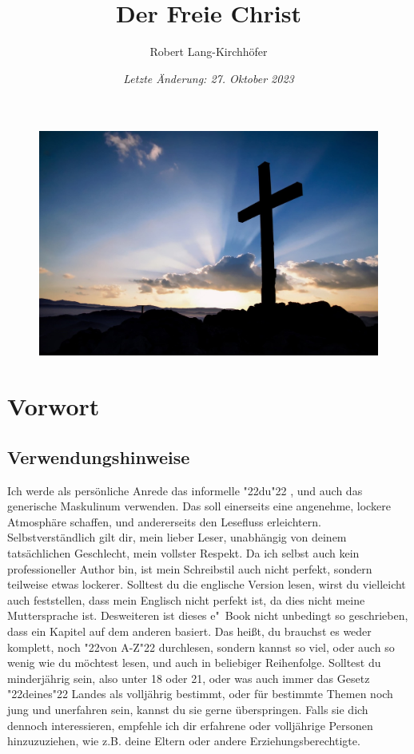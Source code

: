 \documentclass[10pt,a5paper]{article}
\title{\textbf{Der Freie Christ}}
\author{Robert Lang-Kirchh\"ofer}
\date{\textit{Letzte \"Anderung: 27. Oktober 2023}}
\newcommand{\q}[1]{\char"22{#1}\char"22 }
\begin{document}
	\setlength{\parindent}{0mm}
	\maketitle
	\begin{figure}[h]
		\centering
		\includegraphics[width=1\textwidth,keepaspectratio]{"FreeChristian.jpeg"}
	\end{figure}

	\newpage
	\pagecolor{white}
	\tableofcontents
	
	\newpage
	\section{Vorwort}

	\subsection{Verwendungshinweise}
		Ich werde als pers\"onliche Anrede das informelle \q{du},
		und auch das generische Maskulinum verwenden.
		Das soll einerseits eine angenehme,
		lockere Atmosph\"are schaffen,
		und andererseits den Lesefluss erleichtern.
		Selbstverst\"andlich gilt dir,
		mein lieber Leser,
		unabh\"angig von deinem tats\"achlichen Geschlecht,
		mein vollster Respekt.
		Da ich selbst auch kein professioneller Author bin,
		ist mein Schreibstil auch nicht perfekt,
		sondern teilweise etwas lockerer.
		Solltest du die englische Version lesen,
		wirst du vielleicht auch feststellen,
		dass mein Englisch nicht perfekt ist,
		da dies nicht meine Muttersprache ist.
		Desweiteren ist dieses e"~Book nicht unbedingt so geschrieben,
		dass ein Kapitel auf dem anderen basiert.
		Das hei{\ss}t,
		du brauchst es weder komplett,
		noch \q{von A-Z} durchlesen,
		sondern kannst so viel,
		oder auch so wenig wie du m\"ochtest lesen,
		und auch in beliebiger Reihenfolge.
		Solltest du minderj\"ahrig sein,
		also unter 18 oder 21,
		oder was auch immer das Gesetz \q{deines} Landes als vollj\"ahrig bestimmt,
		oder f\"ur bestimmte Themen noch jung und unerfahren sein,
		kannst du sie gerne \"uberspringen.
		Falls sie dich dennoch interessieren,
		empfehle ich dir erfahrene oder vollj\"ahrige Personen hinzuzuziehen,
		wie z.B. deine Eltern oder andere Erziehungsberechtigte.
\end{document}
